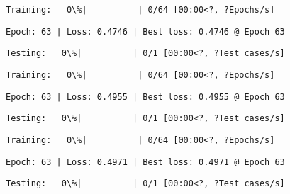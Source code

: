 \documentclass[11pt]{article}
\begin{document}
    
    
    \begin{Verbatim}[commandchars=\\\{\}]
Training:   0\%|          | 0/64 [00:00<?, ?Epochs/s]
    \end{Verbatim}

    
    \begin{Verbatim}[commandchars=\\\{\}]
Epoch: 63 | Loss: 0.4746 | Best loss: 0.4746 @ Epoch 63
    \end{Verbatim}

    
    \begin{Verbatim}[commandchars=\\\{\}]
Testing:   0\%|          | 0/1 [00:00<?, ?Test cases/s]
    \end{Verbatim}

    
    
    \begin{Verbatim}[commandchars=\\\{\}]
Training:   0\%|          | 0/64 [00:00<?, ?Epochs/s]
    \end{Verbatim}

    
    \begin{Verbatim}[commandchars=\\\{\}]
Epoch: 63 | Loss: 0.4955 | Best loss: 0.4955 @ Epoch 63
    \end{Verbatim}

    
    \begin{Verbatim}[commandchars=\\\{\}]
Testing:   0\%|          | 0/1 [00:00<?, ?Test cases/s]
    \end{Verbatim}

    
    
    \begin{Verbatim}[commandchars=\\\{\}]
Training:   0\%|          | 0/64 [00:00<?, ?Epochs/s]
    \end{Verbatim}

    
    \begin{Verbatim}[commandchars=\\\{\}]
Epoch: 63 | Loss: 0.4971 | Best loss: 0.4971 @ Epoch 63
    \end{Verbatim}

    
    \begin{Verbatim}[commandchars=\\\{\}]
Testing:   0\%|          | 0/1 [00:00<?, ?Test cases/s]
    \end{Verbatim}
\end{document}
